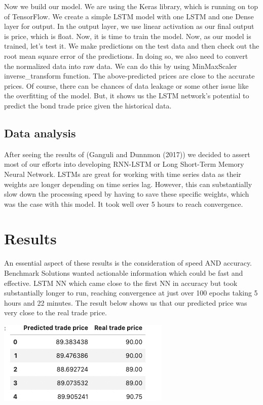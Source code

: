 \documentclass[
  man]{apa6}
\begin{document}
\par

Now we build our model. We are using the Keras library, which is running on top of TensorFlow. We create a simple LSTM model with one LSTM and one Dense layer for output. In the output layer, we use linear activation as our final output is price, which is float. Now, it is time to train the model. Now, as our model is trained, let's test it. We make predictions on the test data and then check out the root mean square error of the predictions. In doing so, we also need to convert the normalized data into raw data. We can do this by using MinMaxScaler inverse\_transform function. The above-predicted prices are close to the accurate prices. Of course, there can be chances of data leakage or some other issue like the overfitting of the model. But, it shows us the LSTM network's potential to predict the bond trade price given the historical data.

\hypertarget{data-analysis}{%
\subsection{Data analysis}\label{data-analysis}}

After seeing the results of (Ganguli and Dunnmon (2017)) we decided to assert most of our efforts into developing RNN-LSTM or Long Short-Term Memory Neural Network. LSTMs are great for working with time series data as their weights are longer depending on time series lag. However, this can substantially slow down the processing speed by having to save these specific weights, which was the case with this model. It took well over 5 hours to reach convergence.

\hypertarget{results}{%
\section{Results}\label{results}}

An essential aspect of these results is the consideration of speed AND accuracy. Benchmark Solutions wanted actionable information which could be fast and effective. LSTM NN which came close to the first NN in accuracy but took substantially longer to run, reaching convergence at just over 100 epochs taking 5 hours and 22 minutes. The result below shows us that our predicted price was very close to the real trade price.

\includegraphics{result.png}
\end{document}
